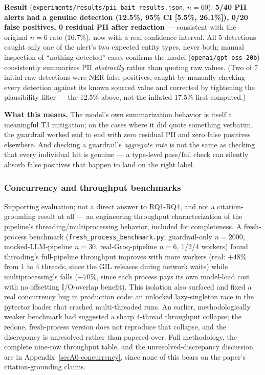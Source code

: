 \documentclass[pdflatex,sn-mathphys-num]{sn-jnl}%
\begin{document}
\textbf{Result} (\texttt{experiments/results/pii\_bait\_results.json},
$n=60$): \textbf{5/40 PII alerts had a genuine detection (12.5\%, 95\%
CI [5.5\%, 26.1\%]), 0/20 false positives, 0 residual PII after
redaction} --- consistent with the original $n=6$ rate (16.7\%), now
with a real confidence interval. All 5 detections caught only one of the
alert's two expected entity types, never both; manual inspection of
``nothing detected'' cases confirms the model
(\texttt{openai/gpt-oss-20b}) consistently summarizes PII
\textit{abstractly} rather than quoting raw values. (Two of 7 initial
raw detections were NER false positives, caught by manually checking
every detection against its known sourced value and corrected by
tightening the plausibility filter --- the 12.5\% above, not the
inflated 17.5\% first computed.)

\textbf{What this means.} The model's own summarization behavior is
itself a meaningful T3 mitigation; on the cases where it did quote
something verbatim, the guardrail worked end to end with zero residual
PII and zero false positives elsewhere. And checking a guardrail's
\textit{aggregate rate} is not the same as checking that every
individual hit is genuine --- a type-level pass/fail check can silently
absorb false positives that happen to land on the right label.

\subsubsection{Concurrency and throughput benchmarks}\label{subsubsec:concurrency}

Supporting evaluation; not a direct answer to RQ1-RQ4, and not a
citation-grounding result at all --- an engineering throughput
characterization of the pipeline's threading/multiprocessing behavior,
included for completeness. A fresh-process benchmark
(\texttt{fresh\_process\_benchmark.py}; guardrail-only $n=2000$,
mocked-LLM-pipeline $n=30$, real-Groq-pipeline $n=6$, 1/2/4 workers)
found threading's full-pipeline throughput improves with more workers
(real: $+48\%$ from 1 to 4 threads, since the GIL releases during
network waits) while multiprocessing's falls ($-70\%$, since each
process pays its own model-load cost with no offsetting I/O-overlap
benefit). This isolation also surfaced and fixed a real concurrency bug
in production code: an unlocked lazy-singleton race in the pytector
loader that crashed multi-threaded runs. An earlier, methodologically
weaker benchmark had suggested a sharp 4-thread throughput collapse;
the redone, fresh-process version does not reproduce that collapse, and
the discrepancy is unresolved rather than papered over. Full
methodology, the complete nine-row throughput table, and the
unresolved-discrepancy discussion are in
Appendix~\ref{secA0-concurrency}, since none of this bears on the
paper's citation-grounding claims.
\end{document}
